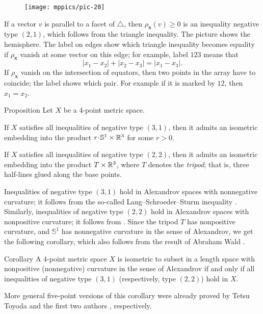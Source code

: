 \documentclass[a4paper,10pt]{article}
\begin{document}
\begin{wrapfigure}{o}{36mm}
\centering
\vskip-4mm
\texttt{[image: mppics/pic-20]}
\vskip-0mm
\end{wrapfigure}

If a vector $v$ is parallel to a facet of $\triangle$, then $\rho_{\bm{x}}(v)\ge 0$ is an inequality negative type $(2,1)$, which follows from the triangle inequality.
The picture shows the hemisphere.
The label on edges show which triangle inequality becomes equality if $\rho_{\bm{x}}$ vanish at some vector on this edge;
for example, label $123$ means that
\[|x_1-x_2|+|x_2-x_3|=|x_1-x_3|.\]
If $\rho_{\bm{x}}$ vanish on the intersection of equators, then two points in the array have to coincide;
the label shows which pair.
For example if it is marked by $12$, then $x_1=x_2$.

\begin{thm}{Proposition}
Let $X$ be a 4-point metric space.

If $X$ satisfies all inequalities of negative type $(3, 1)$, then it admits an isometric embedding into the product $r\cdot \mathbb{S}^1\times\RR^3$ for some $r>0$.

If $X$ satisfies all inequalities of negative type $(2, 2)$, then it admits an isometric embedding into the product $T\times\mathbb{R}^3$, where $T$ denotes the \emph{tripod};
that is, three half-lines glued along the base points.
\end{thm}

Inequalities of negative type $(3, 1)$ hold in Alexandrov spaces with nonnegative curvature; it follows from the so-called Lang--Schroeder--Sturm inequality \cite{lang-schroeder, sturm}.
Similarly, inequalities of negative type $(2, 2)$ hold in Alexandrov spaces with nonpositive curvature; it follows from \cite[9.5]{AKP-2024}.
Since the tripod $T$ has nonpositive curvature, and $\mathbb{S}^1$ has nonnegative curvature in the sense of Alexandrov, we get the following corollary, which also follows from the result of Abraham Wald \cite[§ 7]{wald}.

\begin{thm}{Corollary}
A 4-point metric space $X$ is isometric to subset in a length space with nonpositive (nonnegative) curvature in the sense of Alexandrov if and only if all inequalities of negative type $(3, 1)$ (respectively, type $(2, 2)$) hold in $X$.
\end{thm}

More general five-point versions of this corollary were already proved by Tetsu Toyoda \cite{toyoda,lebedeva-petrunin2021} and the first two authors \cite{lebedeva-petrunin-2024}, respectively.
\end{document}
